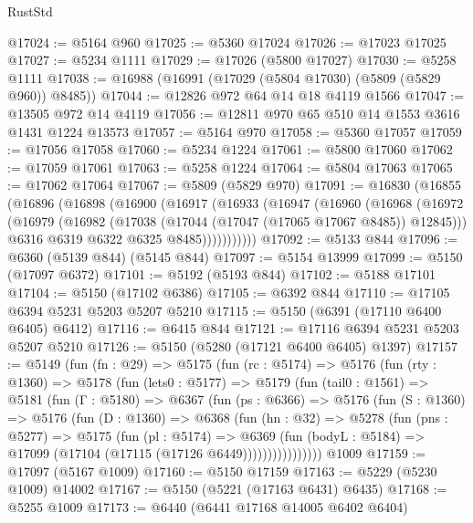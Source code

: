 \begin{lexlean}{RustStd}
\begin{coremodule}
@17024 := @5164 @960
@17025 := @5360 @17024
@17026 := @17023 @17025
@17027 := @5234 @1111
@17029 := @17026 (@5800 @17027)
@17030 := @5258 @1111
@17038 := @16988 (@16991 (@17029 (@5804 @17030) (@5809 (@5829 @960)) @8485))
@17044 := @12826 @972 @64 @14 @18 @4119 @1566
@17047 := @13505 @972 @14 @4119
@17056 := @12811 @970 @65 @510 @14 @1553 @3616 @1431 @1224 @13573
@17057 := @5164 @970
@17058 := @5360 @17057
@17059 := @17056 @17058
@17060 := @5234 @1224
@17061 := @5800 @17060
@17062 := @17059 @17061
@17063 := @5258 @1224
@17064 := @5804 @17063
@17065 := @17062 @17064
@17067 := @5809 (@5829 @970)
@17091 := @16830
    (@16855
      (@16896
        (@16898
          (@16900
            (@16917
              (@16933
                (@16947
                  (@16960
                    (@16968
                      (@16972
                        (@16979
                          (@16982 (@17038 (@17044 (@17047 (@17065 @17067 @8485)) @12845)))
                          @6316
                          @6319
                          @6322
                          @6325
                          @8485)))))))))))
@17092 := @5133 @844
@17096 := @6360 (@5139 @844) (@5145 @844)
@17097 := @5154 @13999
@17099 := @5150 (@17097 @6372)
@17101 := @5192 (@5193 @844)
@17102 := @5188 @17101
@17104 := @5150 (@17102 @6386)
@17105 := @6392 @844
@17110 := @17105 @6394 @5231 @5203 @5207 @5210
@17115 := @5150 (@6391 (@17110 @6400 @6405) @6412)
@17116 := @6415 @844
@17121 := @17116 @6394 @5231 @5203 @5207 @5210
@17126 := @5150 (@5280 (@17121 @6400 @6405) @1397)
@17157 := @5149
    (fun (fn : @29) =>
    @5175
      (fun (rc : @5174) =>
      @5176
        (fun (rty : @1360) =>
        @5178
          (fun (lets0 : @5177) =>
          @5179
            (fun (tail0 : @1561) =>
            @5181
              (fun (Γ : @5180) =>
              @6367
                (fun (ps : @6366) =>
                @5176
                  (fun (S : @1360) =>
                  @5176
                    (fun (D : @1360) =>
                    @6368
                      (fun (hn : @32) =>
                      @5278
                        (fun (pns : @5277) =>
                        @5175
                          (fun (pl : @5174) =>
                          @6369
                            (fun (bodyL : @5184) =>
                            @17099 (@17104 (@17115 (@17126 @6449))))))))))))))))
    @1009
@17159 := @17097 (@5167 @1009)
@17160 := @5150 @17159
@17163 := @5229 (@5230 @1009) @14002
@17167 := @5150 (@5221 (@17163 @6431) @6435)
@17168 := @5255 @1009
@17173 := @6440 (@6441 @17168 @14005 @6402 @6404)

\end{coremodule}
\end{lexlean}
